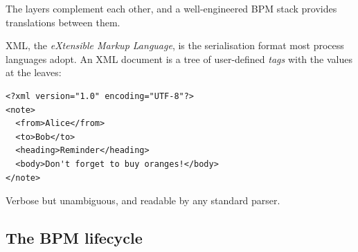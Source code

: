 The layers complement each other, and a well-engineered BPM stack provides translations between them.

XML, the \emph{eXtensible Markup Language}, is the serialisation format most process languages adopt. An XML document is a tree of user-defined \emph{tags} with the values at the leaves:

\begin{verbatim}
<?xml version="1.0" encoding="UTF-8"?>
<note>
  <from>Alice</from>
  <to>Bob</to>
  <heading>Reminder</heading>
  <body>Don't forget to buy oranges!</body>
</note>
\end{verbatim}

Verbose but unambiguous, and readable by any standard parser.

\subsection{The BPM lifecycle}

